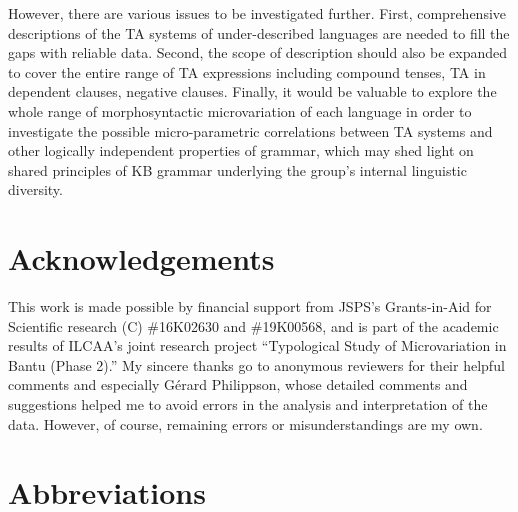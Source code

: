 \documentclass[output=paper]{langscibook}
\begin{document}
However, there are various issues to be investigated further. First, comprehensive descriptions of the TA systems of under-described languages are needed to fill the gaps with reliable data. Second, the scope of description should also be expanded to cover the entire range of TA expressions including compound tenses, TA in dependent clauses, negative clauses. Finally, it would be valuable to explore the whole range of morphosyntactic microvariation of each language in order to investigate the possible micro-parametric correlations between TA systems and other logically independent properties of grammar, which may shed light on shared principles of KB grammar underlying the group’s internal linguistic diversity.

\section*{Acknowledgements}
This work is made possible by financial support from JSPS’s Grants-in-Aid for Scientific research (C) \#16K02630 and \#19K00568, and is part of the academic results of ILCAA’s joint research project “Typological Study of Microvariation in Bantu (Phase 2).” My sincere thanks go to anonymous reviewers for their helpful comments and especially Gérard Philippson, whose detailed comments and suggestions helped me to avoid errors in the analysis and interpretation of the data. However, of course, remaining errors or misunderstandings are my own.

\section*{Abbreviations}
\end{document}
